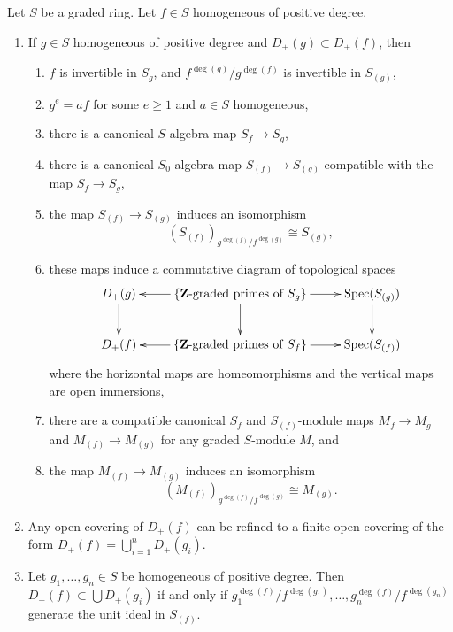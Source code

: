 \begin{lemma}
\label{lemma-standard-open}
Let $S$ be a graded ring. Let $f \in S$ homogeneous of positive degree.
\begin{enumerate}
\item If $g\in S$ homogeneous of positive degree
and $D_{+}(g) \subset D_{+}(f)$, then
\begin{enumerate}
\item $f$ is invertible in $S_g$, and
$f^{\deg(g)}/g^{\deg(f)}$ is invertible in $S_{(g)}$,
\item $g^e = af$ for some $e \geq 1$ and $a \in S$ homogeneous,
\item there is a canonical $S$-algebra map $S_f \to S_g$,
\item there is a canonical $S_0$-algebra map $S_{(f)} \to S_{(g)}$
compatible with the map $S_f \to S_g$,
\item the map $S_{(f)} \to S_{(g)}$ induces an isomorphism
$$
(S_{(f)})_{g^{\deg(f)}/f^{\deg(g)}} \cong S_{(g)},
$$
\item these maps induce a commutative diagram of
topological spaces
$$
\xymatrix{
D_{+}(g) \ar[d] &
\{\mathbf{Z}\text{-graded primes of }S_g\} \ar[l] \ar[r] \ar[d] &
\Spec(S_{(g)}) \ar[d] \\
D_{+}(f) &
\{\mathbf{Z}\text{-graded primes of }S_f\} \ar[l] \ar[r] &
\Spec(S_{(f)})
}
$$
where the horizontal maps are homeomorphisms and the vertical maps
are open immersions,
\item there are a compatible canonical $S_f$ and $S_{(f)}$-module
maps $M_f \to M_g$ and $M_{(f)} \to M_{(g)}$ for any graded $S$-module $M$,
and
\item the map $M_{(f)} \to M_{(g)}$ induces an isomorphism
$$
(M_{(f)})_{g^{\deg(f)}/f^{\deg(g)}} \cong M_{(g)}.
$$
\end{enumerate}
\item Any open covering of $D_{+}(f)$ can be refined to a finite
open covering of the form $D_{+}(f) = \bigcup_{i = 1}^n D_{+}(g_i)$.
\item Let $g_1, \ldots, g_n \in S$ be homogeneous of positive degree.
Then $D_{+}(f) \subset \bigcup D_{+}(g_i)$
if and only if
$g_1^{\deg(f)}/f^{\deg(g_1)}, \ldots, g_n^{\deg(f)}/f^{\deg(g_n)}$
generate the unit ideal in $S_{(f)}$.
\end{enumerate}
\end{lemma}

